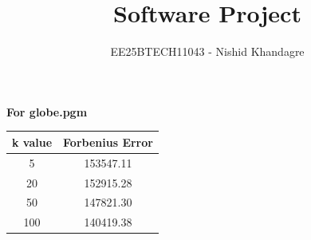 \documentclass[journal]{IEEEtran}
\title{Software Project}
\author{EE25BTECH11043 - Nishid Khandagre}
\begin{document}
\maketitle

\renewcommand{\thefigure}{\theenumi}
\renewcommand{\thetable}{\theenumi}

\textbf{For globe.pgm}

\begin{table}[H]
    \centering
    \begin{tabular}{|c|c|}
        \hline
        \textbf{k value} & \textbf{Forbenius Error} \\  
        \hline
        5 & 153547.11 \\                              
        \hline
        20 & 152915.28 \\                         
        \hline
        50 & 147821.30 \\       
        \hline
        100 & 140419.38 \\       
        \hline
    \end{tabular}
    \label{tab:2}
\end{table}
\end{document}
